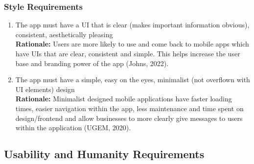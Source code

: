 \documentclass[]{article}
\begin{document}
\subsubsection{Style Requirements}
\label{ssub:style_requirements}
\begin{enumerate}[{LF-S}1. ]
	\item The app must have a UI that is clear (makes important information obvious), consistent, aesthetically pleasing \\
	{\bf Rationale:} Users are more likely to use and come back to mobile apps which have UIs that are clear, consistent and simple. This helps increase the user base and branding power of the app (Johns, 2022). 
	\item The app must have a simple, easy on the eyes, minimalist (not overflown with UI elements) design \\
	{\bf Rationale:} Minimalist designed mobile applications have faster loading times, easier navigation within the app, less maintenance and time spent on design/frontend and allow businesses to more clearly give messages to users within the application (UGEM, 2020).
\end{enumerate}


\subsection{Usability and Humanity Requirements}
\label{sub:usability_and_humanity_requirements}
\end{document}

